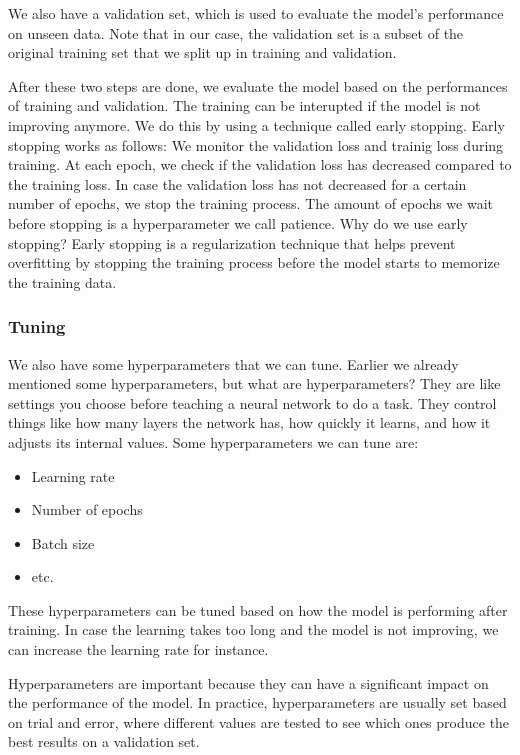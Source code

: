 \documentclass[../paper.tex]{subfiles}
\begin{document}
    We also have a validation set, which is used to evaluate the model's performance on unseen data.
    Note that in our case, the validation set is a subset of the original training set that we split up in training and validation.

    After these two steps are done, we evaluate the model based on the performances of training and validation.
    The training can be interupted if the model is not improving anymore.
    We do this by using a technique called early stopping.
    Early stopping works as follows:
    We monitor the validation loss and trainig loss during training. 
    At each epoch, we check if the validation loss has decreased compared to the training loss.
    In case the validation loss has not decreased for a certain number of epochs, we stop the training process.
    The amount of epochs we wait before stopping is a hyperparameter we call patience.
    Why do we use early stopping?
    Early stopping is a regularization technique that helps prevent overfitting by stopping the training process before the model starts to memorize the training data.\cite{o15}
    \subsubsection{Tuning}
    We also have some hyperparameters that we can tune.
    Earlier we already mentioned some hyperparameters, but what are hyperparameters?
    They are like settings you choose before teaching a neural network to do a task. 
    They control things like how many layers the network has, how quickly it learns, and how it adjusts its internal values.\cite{o16}
    Some hyperparameters we can tune are:
    \begin{itemize}
        \item Learning rate
        \item Number of epochs
        \item Batch size
        \item etc.
    \end{itemize}
    These hyperparameters can be tuned based on how the model is performing after training.
    In case the learning takes too long and the model is not improving, we can increase the learning rate for instance.

    Hyperparameters are important because they can have a significant impact on the performance of the model.
    In practice, hyperparameters are usually set based on trial and error, 
    where different values are tested to see which ones produce the best results on a validation set.
\end{document}
